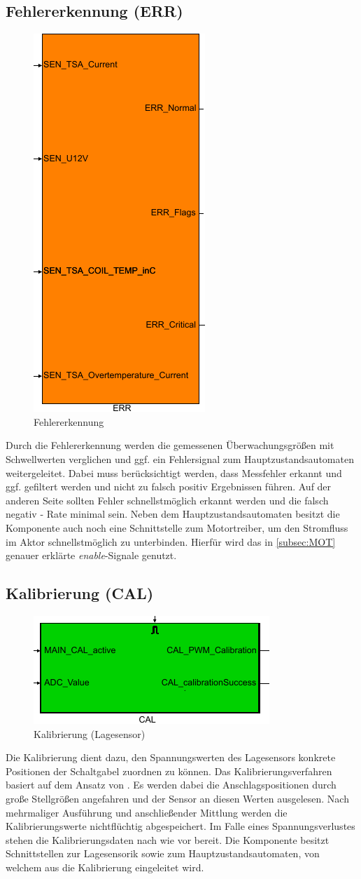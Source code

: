 \subsection{Fehlererkennung (ERR)}
\begin{figure}[H]%
\centering
\includegraphics[width=0.2\columnwidth]{./Bilder/fig_err}%
\caption{Fehlererkennung}%
\label{fig_err}%
\end{figure}
Durch die Fehlererkennung werden die gemessenen Überwachungsgrößen mit Schwellwerten verglichen und ggf. ein Fehlersignal zum Hauptzustandsautomaten weitergeleitet. Dabei muss berücksichtigt werden, dass Messfehler erkannt und ggf. gefiltert werden und nicht zu falsch positiv Ergebnissen führen. Auf der anderen Seite sollten Fehler schnellstmöglich erkannt werden und die falsch negativ - Rate minimal sein. Neben dem Hauptzustandsautomaten besitzt die Komponente auch noch eine Schnittstelle zum Motortreiber, um den Stromfluss im Aktor schnellstmöglich zu unterbinden. Hierfür wird das in \autoref{subsec:MOT} genauer erklärte \textit{enable}-Signale genutzt.

\subsection{Kalibrierung (CAL)}

\begin{figure}[H]%
\centering
\includegraphics[width=0.3\columnwidth]{./Bilder/fig_cal}%
\caption{Kalibrierung (Lagesensor)}%
\label{fig_cal}%
\end{figure}

Die Kalibrierung dient dazu, den Spannungswerten des Lagesensors konkrete Positionen der Schaltgabel zuordnen zu können. Das Kalibrierungsverfahren basiert auf dem Ansatz von \cite{VorgaengerADP}. Es werden dabei die Anschlagspositionen durch große Stellgrößen angefahren und der Sensor an diesen Werten ausgelesen. Nach mehrmaliger Ausführung und anschließender Mittlung werden die Kalibrierungswerte nichtflüchtig abgespeichert. Im Falle eines Spannungsverlustes stehen die Kalibrierungsdaten nach wie vor bereit. Die Komponente besitzt Schnittstellen zur Lagesensorik sowie zum Hauptzustandsautomaten, von welchem aus die Kalibrierung eingeleitet wird.

